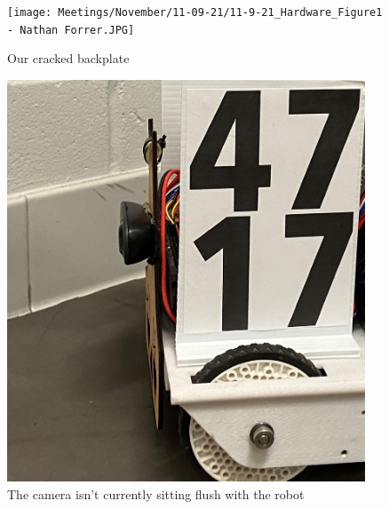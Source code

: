\begin{figure}[ht]
\centering
\begin{minipage}[b]{.48\textwidth}
  \centering
  \texttt{[image: Meetings/November/11-09-21/11-9-21\_Hardware\_Figure1 - Nathan Forrer.JPG]}
  \caption{Our cracked backplate}
  \label{fig:110921_1}
\end{minipage}%
\hfill%
\begin{minipage}[b]{.48\textwidth}
  \centering
  \includegraphics[width=0.95\textwidth]{Meetings/November/11-09-21/11-9-21_Hardware_Figure2 - Nathan Forrer.JPG}
  \caption{The camera isn't currently sitting flush with the robot}
  \label{fig:110921_2}
\end{minipage}
\end{figure}

